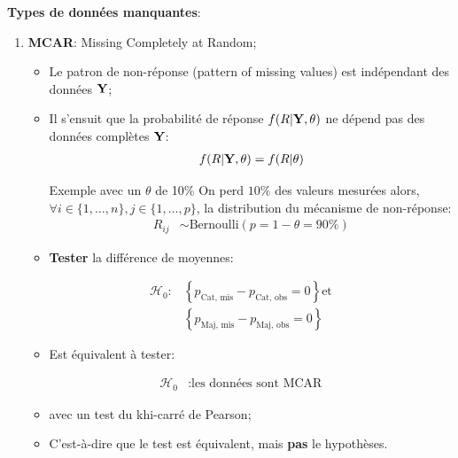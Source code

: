 \documentclass[10pt, french]{article}
\begin{document}
\begin{multicols*}{3}
\textbf{Types de données manquantes}:
\begin{enumerate}
	\item	\textbf{MCAR}: Missing Completely at Random;
		\begin{itemize}[leftmargin = *]
		\item	Le patron de non-réponse (pattern of missing values) est indépendant des données $\mathbf{Y}$;
		\item	Il s'ensuit que la probabilité de réponse $f(R | \mathbf{Y}, \theta)$ ne dépend pas des données complètes $\mathbf{Y}$:
			\begin{align*}
			f(R | \mathbf{Y}, \theta) &= f(R | \theta) \\
			\end{align*}
		\begin{examplebox}{Exemple avec un $\theta$ de 10\%}
		On perd $10\%$ des valeurs mesurées alors, $\forall i \in \{1, \dots, n\}, j \in \{1, \dots, p\}$, la distribution du mécanisme de non-réponse:
		\setlength{\mathindent}{-1cm}
			\begin{align*}
			R_{ij} 
			&\sim 	\text{Bernoulli}(p = 1 - \theta =  90\%)
			\end{align*}
		\setlength{\mathindent}{1cm}
		\end{examplebox}
		\item	\textbf{Tester} la différence de moyennes:
		\end{itemize}	
		\setlength{\mathindent}{-2cm}
			\begin{align*}
			\mathcal{H}_{0}:
			&\left\{ p_{\text{Cat, mis}} - p_{\text{Cat, obs}} = 0 \right\} 
			\text{et}	\\
			&\left\{ p_{\text{Maj, mis}} - p_{\text{Maj, obs}} = 0 \right\}
			\end{align*}
		\setlength{\mathindent}{1cm}
		\begin{itemize}
		\item[]	Est équivalent à tester: 
		\end{itemize}	
		\setlength{\mathindent}{-2cm}
			\begin{align*}
			\mathcal{H}_{0}
			&:	\text{les données sont MCAR}
			\end{align*}
		\setlength{\mathindent}{1cm}
		\begin{itemize}
		\item[]	avec un test du khi-carré de Pearson;
		\item[]	C'est-à-dire que le test est équivalent, mais \textbf{pas} le hypothèses.
		\end{itemize}	

\end{enumerate}
\end{multicols*}
\end{document}
